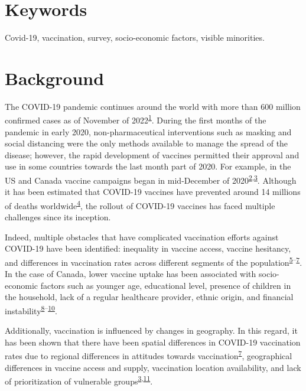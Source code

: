 \documentclass[
  letterpaper,
  DIV=11,
  numbers=noendperiod]{scrartcl}
\begin{document}
\hypertarget{keywords}{%
\section*{Keywords}\label{keywords}}

Covid-19, vaccination, survey, socio-economic factors, visible
minorities.

\hypertarget{background}{%
\section{Background}\label{background}}

The COVID-19 pandemic continues around the world with more than 600
million confirmed cases as of November of
2022\textsuperscript{\protect\hyperlink{ref-WHO-Covid}{1}}. During the
first months of the pandemic in early 2020, non-pharmaceutical
interventions such as masking and social distancing were the only
methods available to manage the spread of the disease; however, the
rapid development of vaccines permitted their approval and use in some
countries towards the last month part of 2020. For example, in the US
and Canada vaccine campaigns began in mid-December of
2020\textsuperscript{\protect\hyperlink{ref-tanne2020}{2},\protect\hyperlink{ref-bogoch2022}{3}}.
Although it has been estimated that COVID-19 vaccines have prevented
around 14 millions of deaths
worldwide\textsuperscript{\protect\hyperlink{ref-watson2022}{4}}, the
rollout of COVID-19 vaccines has faced multiple challenges since its
inception.

Indeed, multiple obstacles that have complicated vaccination efforts
against COVID-19 have been identified: inequality in vaccine access,
vaccine hesitancy, and differences in vaccination rates across different
segments of the
population\textsuperscript{\protect\hyperlink{ref-gerretsen2021}{5}--\protect\hyperlink{ref-malik2020}{7}}.
In the case of Canada, lower vaccine uptake has been associated with
socio-economic factors such as younger age, educational level, presence
of children in the household, lack of a regular healthcare provider,
ethnic origin, and financial
instability\textsuperscript{\protect\hyperlink{ref-guay2022}{8}--\protect\hyperlink{ref-hussain2022}{10}}.

Additionally, vaccination is influenced by changes in geography. In this
regard, it has been shown that there have been spatial differences in
COVID-19 vaccination rates due to regional differences in attitudes
towards
vaccination\textsuperscript{\protect\hyperlink{ref-malik2020}{7}},
geographical differences in vaccine access and supply, vaccination
location availability, and lack of prioritization of vulnerable
groups\textsuperscript{\protect\hyperlink{ref-bogoch2022}{3},\protect\hyperlink{ref-nguyen2021}{11}}.
\end{document}
